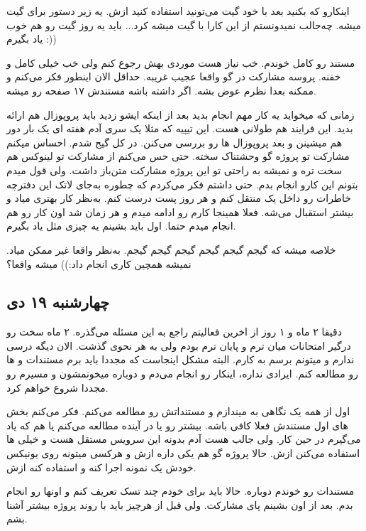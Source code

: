 اینکارو که بکنید بعد با خود گیت می‌تونید استفاده کنید ازش. یه زیر دستور برای گیت میشه. چه‌جالب نمیدونستم از این کارا با گیت میشه کرد...
باید یه روز گیت رو هم خوب یاد بگیرم :))

مستند رو کامل خوندم. خب نیاز هست موردی بهش رجوع کنم ولی خب خیلی کامل و خفنه. پروسه مشارکت در گو واقعا عجیب غریبه. حداقل الان
اینطور فکر می‌کنم و ممکنه بعدا نظرم عوض بشه. اگر  داشته باشه مستندش ۱۷ صفحه رو میشه.

زمانی که میخواید یه کار مهم انجام بدید بعد از اینکه ایشو زدید باید پروپوزال هم ارائه بدید. این فرایند هم طولانی هست. این تیپیه که مثلا
یک سری آدم هفته ای یک بار دور هم میشینن و بعد پروپوزال ها رو بررسی می‌کنن. در کل گیج شدم. احساس میکنم مشارکت تو پروژه گو
وحشتناک سخته. حتی حس می‌کنم از مشارکت تو لینوکس هم سخت تره و نمیشه به راحتی تو این پروژه مشارکت متن‌باز داشت.
ولی قول میدم بتونم این کارو انجام بدم. حتی داشتم فکر می‌کردم که چطوره به‌جای لاتک این دفترچه خاطرات رو داخل یک 
منتقل کنم و هر روز پست درست کنم. به‌نظر کار بهتری میاد و بیشتر استقبال می‌شه. فعلا همینجا کارم رو ادامه میدم و هر زمان شد اون کار رو هم
انجام میدم حتما. اول باید بشینم یه چیزی مثل  یاد بگیرم.

خلاصه میشه که گیجم گیجم گیجم گیجم گیجم گیجم. به‌نظر واقعا غیر ممکن میاد. نمیشه همچین کاری انجام داد:)) میشه واقعا؟

\subsection{چهارشنبه ۱۹ دی}
دقیقا ۲ ماه و ۱ روز از اخرین فعالیتم راجع به این مسئله می‌گذره. ۲ ماه سخت رو درگیر امتحانات میان ترم و پایان ترم بودم ولی به هر نحوی گذشت.
الان دیگه درسی ندارم و میتونم برسم به کارم. البته مشکل اینجاست که مجددا باید برم مستندات و  ها رو مطالعه کنم.
ایرادی نداره، اینکار رو انجام می‌دم و دوباره میخونمشون و مسیرم رو مجددا شروع خواهم کرد.

اول از همه یک نگاهی به  میندازم و مستنداتش
رو مطالعه می‌کنم. فکر می‌کنم بخش های اول مستندش فعلا کافی باشه. بیشتر رو یا در آینده مطالعه می‌کنم یا هم که یاد می‌گیرم در حین کار.
ولی جالب هست آدم بدونه این سرویس مستقل هست و خیلی ها استفاده می‌کنن ازش. حالا پروژه گو هم یکی داره ازش و هرکسی میتونه
روی یونیکس خودش یک نمونه اجرا کنه و استفاده کنه ازش.

مستندات رو خوندم دوباره. حالا باید برای خودم چند تسک تعریف کنم و اونها رو انجام بدم. بعد از اون بشینم پای مشارکت.
ولی قبل از هرچیز باید با روند پروژه بیشتر آشنا بشم.

